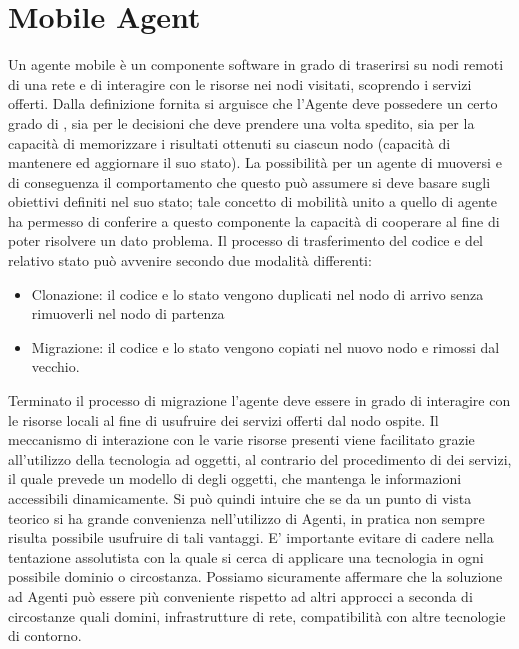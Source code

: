 \section{Mobile Agent}
Un agente mobile\cite{fuggetta} è un componente software in grado di traserirsi su nodi remoti di una rete e di interagire con le risorse nei nodi visitati, scoprendo i servizi offerti.
Dalla definizione fornita si arguisce che l'Agente deve possedere un certo grado di , sia per le decisioni che deve prendere una volta spedito, sia per la capacità di memorizzare i risultati ottenuti su ciascun nodo (capacità di mantenere ed aggiornare il suo stato).
La possibilità per un agente di muoversi e di conseguenza il comportamento che questo può assumere si deve basare sugli obiettivi definiti nel suo stato; tale concetto di mobilità unito a quello di agente ha permesso di conferire a questo componente la capacità di cooperare al fine di poter risolvere un dato problema.
Il processo di trasferimento del codice e del relativo stato può avvenire secondo due modalità differenti:
\begin{itemize}
\item Clonazione\cite{fuggetta}: il codice e lo stato vengono duplicati nel nodo di arrivo senza rimuoverli nel nodo di partenza
\item Migrazione\cite{fuggetta}: il codice e lo stato vengono copiati nel nuovo nodo e rimossi dal vecchio. 
\end{itemize}
Terminato il processo di migrazione l'agente deve essere in grado di interagire con le risorse locali al fine di usufruire dei servizi offerti dal nodo ospite.
Il meccanismo di interazione con le varie risorse presenti viene facilitato grazie all'utilizzo della tecnologia ad oggetti, al contrario del procedimento di  dei servizi, il quale prevede un modello di    degli oggetti, che mantenga le informazioni accessibili dinamicamente.
Si può quindi intuire che se da un punto di vista teorico si ha grande convenienza nell’utilizzo di Agenti, in pratica non sempre risulta possibile usufruire di tali vantaggi. E’ importante evitare di cadere nella tentazione assolutista con la quale si cerca di applicare una tecnologia in ogni possibile dominio o circostanza. Possiamo sicuramente affermare che la soluzione ad Agenti può essere più conveniente rispetto ad altri approcci a seconda di circostanze quali domini, infrastrutture di rete, compatibilità con altre
tecnologie di contorno.  

